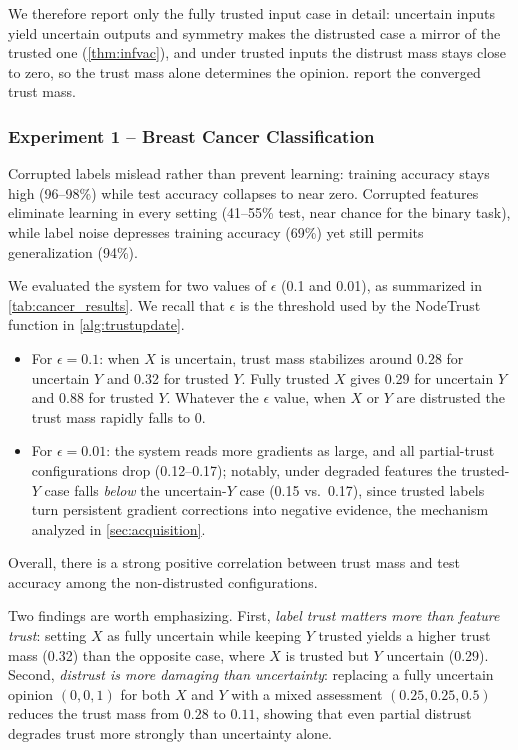 We therefore report only the fully trusted input case in detail: uncertain inputs yield uncertain outputs and symmetry makes the distrusted case a mirror of the trusted one (\cref{thm:infvac}), and under trusted inputs the distrust mass stays close to zero, so the trust mass alone determines the opinion.  report the converged trust mass.


\subsubsection*{Experiment 1 -- Breast Cancer Classification}
Corrupted labels mislead rather than prevent learning: training accuracy stays high (96--98\%) while test accuracy collapses to near zero. Corrupted features eliminate learning in every setting (41--55\% test, near chance for the binary task), while label noise depresses training accuracy (69\%) yet still permits generalization (94\%).

We evaluated the system for two values of $\epsilon$ (0.1 and 0.01), as summarized in \cref{tab:cancer_results}. We recall that $\epsilon$ is the threshold used by the NodeTrust function in \cref{alg:trustupdate}.
\begin{itemize}
\item For $\epsilon = 0.1$: when $X$ is uncertain, trust mass stabilizes around 0.28 for uncertain $Y$ and 0.32 for trusted $Y$. Fully trusted $X$ gives 0.29 for uncertain $Y$ and $0.88$ for trusted $Y$. Whatever the $\epsilon$ value, when $X$ or $Y$ are distrusted the trust mass rapidly falls to 0.
\item For $\epsilon = 0.01$: the system reads more gradients as large, and all partial-trust configurations drop (0.12--0.17); notably, under degraded features the trusted-$Y$ case falls \emph{below} the uncertain-$Y$ case (0.15 vs.\ 0.17), since trusted labels turn persistent gradient corrections into negative evidence, the mechanism analyzed in \cref{sec:acquisition}.
\end{itemize}
Overall, there is a strong positive correlation between trust mass and test accuracy among the non-distrusted configurations.

Two findings are worth emphasizing. First, \emph{label trust matters more than feature trust}: setting $X$ as fully uncertain while keeping $Y$ trusted yields a higher trust mass (0.32) than the opposite case, where $X$ is trusted but $Y$ uncertain (0.29). Second, \emph{distrust is more damaging than uncertainty}: replacing a fully uncertain opinion $(0,0,1)$ for both $X$ and $Y$ with a mixed assessment $(0.25,0.25,0.5)$ reduces the trust mass from $0.28$ to $0.11$, showing that even partial distrust degrades trust more strongly than uncertainty alone.




